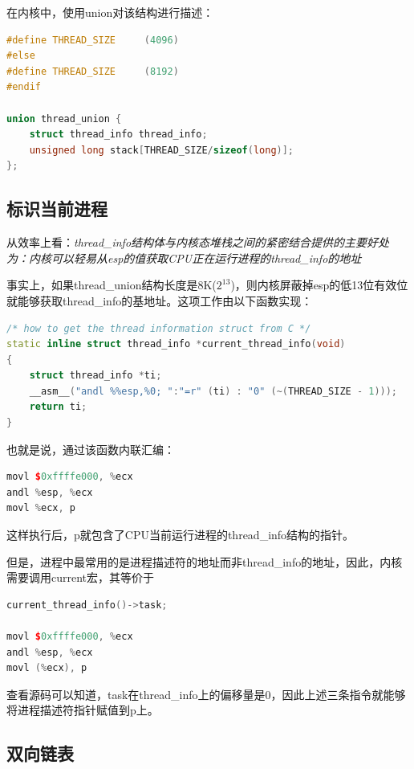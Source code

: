     在内核中，使用union对该结构进行描述：

\begin{lstlisting}[language=C++]
#define THREAD_SIZE     (4096)
#else
#define THREAD_SIZE		(8192)
#endif

union thread_union {
    struct thread_info thread_info;
    unsigned long stack[THREAD_SIZE/sizeof(long)];
};
\end{lstlisting}

\subsection{标识当前进程}

    从效率上看：\emph{thread\_info结构体与内核态堆栈之间的紧密结合提供的主要好处为：内核可以轻易从esp的值获取CPU正在运行进程的thread\_info的地址}

    事实上，如果thread\_union结构长度是8K($2^{13}$)，则内核屏蔽掉esp的低13位有效位就能够获取thread\_info的基地址。这项工作由以下函数实现：

\begin{lstlisting}[language=C++]
/* how to get the thread information struct from C */
static inline struct thread_info *current_thread_info(void)
{
    struct thread_info *ti;
    __asm__("andl %%esp,%0; ":"=r" (ti) : "0" (~(THREAD_SIZE - 1)));
    return ti;
}
\end{lstlisting}

    也就是说，通过该函数内联汇编：

\begin{lstlisting}[language=C++]
movl $0xffffe000, %ecx
andl %esp, %ecx
movl %ecx, p
\end{lstlisting}

    这样执行后，p就包含了CPU当前运行进程的thread\_info结构的指针。

    但是，进程中最常用的是进程描述符的地址而非thread\_info的地址，因此，内核需要调用current宏，其等价于

\begin{lstlisting}[language=C++]
current_thread_info()->task;

movl $0xffffe000, %ecx
andl %esp, %ecx
movl (%ecx), p
\end{lstlisting}

    查看源码可以知道，task在thread\_info上的偏移量是0，因此上述三条指令就能够将进程描述符指针赋值到p上。

\subsection{双向链表}

